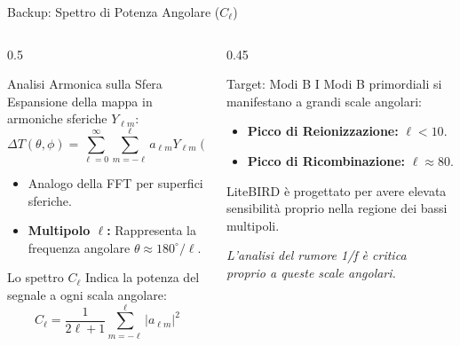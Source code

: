 \documentclass[10pt, aspectratio=169, handout]{beamer}
\begin{document}
\begin{frame}{Backup: Spettro di Potenza Angolare ($C_\ell$)}
  \begin{columns}[T]
    \begin{column}{0.5\textwidth}
      \begin{block}{Analisi Armonica sulla Sfera}
        \footnotesize
        Espansione della mappa in armoniche sferiche $Y_{\ell m}$:
        \[ \Delta T(\theta, \phi) = \sum_{\ell=0}^{\infty} \sum_{m=-\ell}^{\ell} a_{\ell m} Y_{\ell m}(\theta, \phi) \]
        \begin{itemize}
            \item Analogo della FFT per superfici sferiche.
            \item \textbf{Multipolo $\ell$:} Rappresenta la frequenza angolare $\theta \approx 180^\circ / \ell$.
        \end{itemize}
      \end{block}

      \begin{block}{Lo spettro $C_\ell$}
        \footnotesize
        Indica la potenza del segnale a ogni scala angolare:
        \[ C_\ell = \frac{1}{2\ell + 1} \sum_{m=-\ell}^{\ell} |a_{\ell m}|^2 \]
      \end{block}
    \end{column}

    \begin{column}{0.45\textwidth}
      \vspace{0.8cm}
      \begin{alertblock}{Target: Modi B}
        \scriptsize
        I Modi B primordiali si manifestano a grandi scale angolari:
        \begin{itemize}
            \item \textbf{Picco di Reionizzazione:} $\ell < 10$.
            \item \textbf{Picco di Ricombinazione:} $\ell \approx 80$.
        \end{itemize}
        \vspace{0.2cm}
        LiteBIRD è progettato per avere elevata sensibilità proprio nella regione dei bassi multipoli.
      \end{alertblock}
      
      \vspace{1cm}
      \centering
      \scriptsize \textit{L'analisi del rumore 1/f è critica \\ proprio a queste scale angolari.}
    \end{column}
  \end{columns}
\end{frame}
\end{document}
